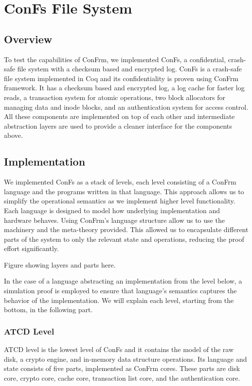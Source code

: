 \chapter{ConFs File System}

\section{Overview}
To test the capabilities of ConFrm, we implemented ConFs, a confidential, crash-safe file system with a checksum based and encrypted log. 
ConFs is a crash-safe file system implemented in Coq and its confidentiality is proven using ConFrm framework. It has a checksum based and encrypted log, a log cache for faster log reads, a transaction system for atomic operations, two block allocators for managing data and inode blocks, and an authentication system for access control. All these components are implemented on top of each other and intermediate abstraction layers are used to provide a cleaner interface for the components above.

\section{Implementation}
We implemented ConFs as a stack of levels, each level consisting of a ConFrm language and the programs written in that language. This approach allows us to simplify the operational semantics as we implement higher level functionality. Each language is designed to model how underlying implementation and hardware behaves. Using ConFrm's language structure allow us to use the machinery and the meta-theory provided. This allowed us to encapsulate different parts of the system to only the relevant state and operations, reducing the proof effort significantly.

{\color{red} Figure showing layers and parts here}.

In the case of a language abstracting an implementation from the level below, a simulation proof is employed to ensure that language's semantics captures the behavior of the implementation. We will explain each level, starting from the bottom, in the following part.

\subsection{ATCD Level}
ATCD level is the lowest level of ConFs and it contains the model of the raw disk, a crypto engine, and in-memory data structure operations. Its language and state consists of five parts, implemented as ConFrm cores. These parts are disk core, crypto core, cache core, transaction list core, and the authentication core. 

